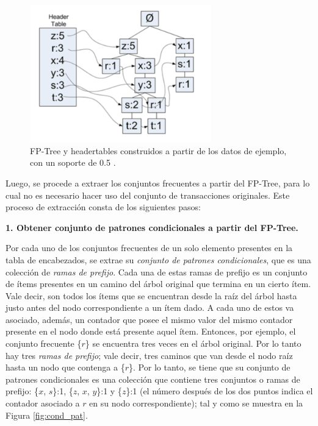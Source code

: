 \begin{figure}[h!]
\begin{center}
\includegraphics[width=0.7\textwidth]{imagenes/fptree_header.png}
\end{center}
\vspace*{-5mm}
\caption{FP-Tree y headertables construidos a partir de los datos de ejemplo, con un soporte de 0.5 \cite{harrington2012machine}.}
\label{fig:fptree_header}
\end{figure}

Luego, se procede a extraer los conjuntos frecuentes a partir del FP-Tree, para lo cual no es necesario hacer uso del conjunto de transacciones originales. Este proceso de extracción consta de los siguientes pasos:

\textbf{1. Obtener conjunto de patrones condicionales a partir del FP-Tree.}

Por cada uno de los conjuntos frecuentes de un solo elemento presentes en la tabla de encabezados, se extrae su \textit{conjunto de patrones condicionales}, que es una colección de \textit{ramas de prefijo}. Cada una de estas ramas de prefijo es un conjunto de ítems presentes en un camino del árbol original que termina en un cierto ítem. Vale decir, son todos los ítems que se encuentran desde la raíz del árbol hasta justo antes del nodo correspondiente a un ítem dado. A cada uno de estos va asociado, además, un contador que posee el mismo valor del mismo contador presente en el nodo donde está presente aquel ítem. Entonces, por ejemplo, el conjunto frecuente \{$r$\} se encuentra tres veces en el árbol original. Por lo tanto hay tres \textit{ramas de prefijo}; vale decir, tres caminos que van desde el nodo raíz hasta un nodo que contenga a \{$r$\}. Por lo tanto, se tiene que su conjunto de patrones condicionales es una colección que contiene tres conjuntos o ramas de prefijo: \{$x$, $s$\}:1, \{$z$, $x$, $y$\}:1 y \{$z$\}:1 (el número después de los dos puntos indica el contador asociado a $r$ en su nodo correspondiente); tal y como se muestra en la Figura \ref{fig:cond_pat}.

